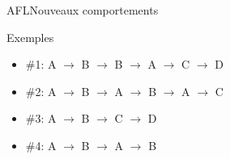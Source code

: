 \begin{frame}{AFL}{Nouveaux comportements}
  {\Large \centerline{Exemples}}

  \hspace{20.5cm}

  \begin{itemize}
    \item{\#1: A $\rightarrow$ B $\rightarrow$ B $\rightarrow$ A $\rightarrow$ C $\rightarrow$ D} \pause
    \item{\#2: A $\rightarrow$ B $\rightarrow$ A $\rightarrow$ B $\rightarrow$ A $\rightarrow$ C} \pause
    \item{\#3: A $\rightarrow$ B $\rightarrow$ C $\rightarrow$ D} \pause
    \item{\#4: A $\rightarrow$ B $\rightarrow$ A $\rightarrow$ B}
  \end{itemize}
\end{frame}

